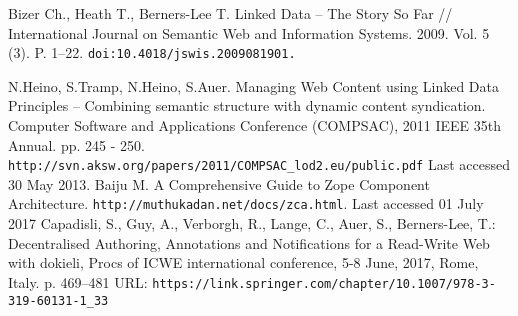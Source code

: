 \documentclass[conference,a4paper]{IEEEtran}
\providecommand\url[1]{\texttt{#1}}
\begin{document}
\begin{thebibliography}{99}
 Bizer Ch., Heath T., Berners-Lee T. Linked Data -- The Story So
  Far // International Journal on Semantic Web and Information Systems.
  2009. Vol. 5 (3). P. 1--22. \url{doi:10.4018/jswis.2009081901. }

 N.Heino, S.Tramp, N.Heino, S.Auer. Managing Web Content using Linked Data Principles – Combining semantic structure with dynamic content syndication. Computer Software and Applications Conference (COMPSAC), 2011 IEEE 35th Annual. pp. 245 - 250.  \url{http://svn.aksw.org/papers/2011/COMPSAC_lod2.eu/public.pdf}  Last accessed 30 May 2013.
  Baiju M. A Comprehensive Guide to Zope Component Architecture.
\url{http://muthukadan.net/docs/zca.html}. Last accessed 01 July 2017
  Capadisli, S., Guy, A., Verborgh, R., Lange, C., Auer, S., Berners-Lee, T.: Decentralised Authoring, Annotations and Notifications for a Read-Write Web with dokieli, Procs of ICWE international conference, 5-8 June, 2017, Rome, Italy. p. 469--481 URL: \url{https://link.springer.com/chapter/10.1007/978-3-319-60131-1_33}




\end{thebibliography}
\end{document}
